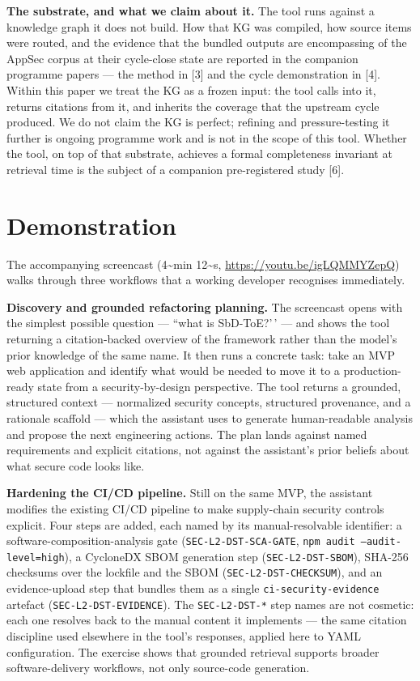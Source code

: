 \documentclass[conference]{IEEEtran}
\begin{document}
\textbf{The substrate, and what we claim about it.} The tool runs
against a knowledge graph it does not build. How that KG was compiled,
how source items were routed, and the evidence that the bundled outputs
are encompassing of the AppSec corpus at their cycle-close state are
reported in the companion programme papers --- the method in {[}3{]} and
the cycle demonstration in {[}4{]}. Within this paper we treat the KG as
a frozen input: the tool calls into it, returns citations from it, and
inherits the coverage that the upstream cycle produced. We do not claim
the KG is perfect; refining and pressure-testing it further is ongoing
programme work and is not in the scope of this tool. Whether the tool,
on top of that substrate, achieves a formal completeness invariant at
retrieval time is the subject of a companion pre-registered study
{[}6{]}.

\section{Demonstration}\label{demonstration}

The accompanying screencast (4\textasciitilde min 12\textasciitilde s,
\url{https://youtu.be/igLQMMYZepQ}) walks through three workflows that a
working developer recognises immediately.

\textbf{Discovery and grounded refactoring planning.} The screencast
opens with the simplest possible question --- ``what is SbD-ToE?'\,' ---
and shows the tool returning a citation-backed overview of the framework
rather than the model's prior knowledge of the same name. It then runs a
concrete task: take an MVP web application and identify what would be
needed to move it to a production-ready state from a security-by-design
perspective. The tool returns a grounded, structured context ---
normalized security concepts, structured provenance, and a rationale
scaffold --- which the assistant uses to generate human-readable
analysis and propose the next engineering actions. The plan lands
against named requirements and explicit citations, not against the
assistant's prior beliefs about what secure code looks like.

\textbf{Hardening the CI/CD pipeline.} Still on the same MVP, the
assistant modifies the existing CI/CD pipeline to make supply-chain
security controls explicit. Four steps are added, each named by its
manual-resolvable identifier: a software-composition-analysis gate
(\texttt{SEC-L2-DST-SCA-GATE}, \texttt{npm audit --audit-level=high}), a
CycloneDX SBOM generation step (\texttt{SEC-L2-DST-SBOM}), SHA-256
checksums over the lockfile and the SBOM (\texttt{SEC-L2-DST-CHECKSUM}),
and an evidence-upload step that bundles them as a single
\texttt{ci-security-evidence} artefact (\texttt{SEC-L2-DST-EVIDENCE}).
The \texttt{SEC-L2-DST-*} step names are not cosmetic: each one resolves
back to the manual content it implements --- the same citation
discipline used elsewhere in the tool's responses, applied here to YAML
configuration. The exercise shows that grounded retrieval supports
broader software-delivery workflows, not only source-code generation.
\end{document}
